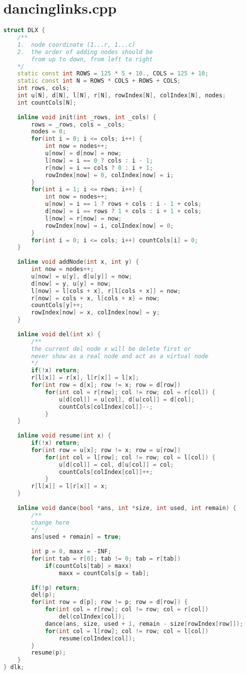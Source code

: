 \section{dancinglinks.cpp}
\begin{lstlisting}[language=c++]
struct DLX {
	/**
	1.	node coordinate (1...r, 1...c)
	2.	the order of adding nodes should be 
		from up to down, from left to right
	*/
	static const int ROWS = 125 * 5 + 10., COLS = 125 + 10;
	static const int N = ROWS * COLS + ROWS + COLS;
	int rows, cols;
	int u[N], d[N], l[N], r[N], rowIndex[N], colIndex[N], nodes;
	int countCols[N];
	
	inline void init(int _rows, int _cols) {
		rows = _rows, cols = _cols;
		nodes = 0;
		for(int i = 0; i <= cols; i++) {
			int now = nodes++;
			u[now] = d[now] = now;
			l[now] = i == 0 ? cols : i - 1;
			r[now] = i == cols ? 0 : i + 1;
			rowIndex[now] = 0, colIndex[now] = i;
		}
		for(int i = 1; i <= rows; i++) {
			int now = nodes++;
			u[now] = i == 1 ? rows + cols : i - 1 + cols;
			d[now] = i == rows ? 1 + cols : i + 1 + cols;
			l[now] = r[now] = now;
			rowIndex[now] = i, colIndex[now] = 0;
		}
		for(int i = 0; i <= cols; i++) countCols[i] = 0;
	}
	
	inline void addNode(int x, int y) {
		int now = nodes++;
		u[now] = u[y], d[u[y]] = now;
		d[now] = y, u[y] = now;
		l[now] = l[cols + x], r[l[cols + x]] = now;
		r[now] = cols + x, l[cols + x] = now;
		countCols[y]++;
		rowIndex[now] = x, colIndex[now] = y;
	}
	
	inline void del(int x) {
		/**
		the current del node x will be delete first or
		never show as a real node and act as a virtual node
		*/
		if(!x) return;
		r[l[x]] = r[x], l[r[x]] = l[x];
		for(int row = d[x]; row != x; row = d[row])
			for(int col = r[row]; col != row; col = r[col]) {
				u[d[col]] = u[col], d[u[col]] = d[col];
				countCols[colIndex[col]]--;
			}
	}
	
	inline void resume(int x) {
		if(!x) return;
		for(int row = u[x]; row != x; row = u[row])
			for(int col = l[row]; col != row; col = l[col]) {
				u[d[col]] = col, d[u[col]] = col;
				countCols[colIndex[col]]++;
			}
		r[l[x]] = l[r[x]] = x;
	}
	
	inline void dance(bool *ans, int *size, int used, int remain) {
		/**
		change here
		*/
		ans[used + remain] = true;
		
		int p = 0, maxx = -INF;
		for(int tab = r[0]; tab != 0; tab = r[tab])
			if(countCols[tab] > maxx)
				maxx = countCols[p = tab];
		
		if(!p) return;
		del(p);
		for(int row = d[p]; row != p; row = d[row]) {
			for(int col = r[row]; col != row; col = r[col])
				del(colIndex[col]);
			dance(ans, size, used + 1, remain - size[rowIndex[row]]);
			for(int col = l[row]; col != row; col = l[col])
				resume(colIndex[col]);
		}
		resume(p);
	}
} dlk;
\end{lstlisting}
